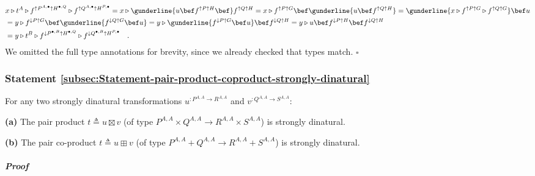\begin{align*}
 & x\triangleright t^{A}\triangleright f^{\uparrow P^{A,\bullet}\uparrow H^{\bullet,Q}}\triangleright f^{\uparrow Q^{A,\bullet}\uparrow H^{P,\bullet}}=x\triangleright\gunderline{u\bef f^{\uparrow P\uparrow H}\bef}f^{\uparrow Q\uparrow H}=x\triangleright f^{\uparrow P\uparrow G}\bef\gunderline{u\bef f^{\uparrow Q\uparrow H}}=\gunderline{x\triangleright f^{\uparrow P\uparrow G}\triangleright f^{\uparrow Q\uparrow G}}\bef u\\
 & =y\triangleright f^{\downarrow P\uparrow G}\bef\gunderline{f^{\downarrow Q\uparrow G}\bef u}=y\triangleright\gunderline{f^{\downarrow P\uparrow G}\bef u}\bef f^{\downarrow Q\uparrow H}=y\triangleright u\bef f^{\downarrow P\uparrow H}\bef f^{\downarrow Q\uparrow H}\\
 & =y\triangleright t^{B}\triangleright f^{\downarrow P^{\bullet,B}\uparrow H^{\bullet,Q}}\triangleright f^{\downarrow Q^{\bullet,B}\uparrow H^{P,\bullet}}\quad.
\end{align*}
We omitted the full type annotations for brevity, since we already
checked that types match. $\square$

\subsubsection{Statement \label{subsec:Statement-pair-product-coproduct-strongly-dinatural}\ref{subsec:Statement-pair-product-coproduct-strongly-dinatural}}

For any two strongly dinatural transformations $u^{:P^{A,A}\rightarrow R^{A,A}}$
and $v^{:Q^{A,A}\rightarrow S^{A,A}}$:

\textbf{(a)} The pair product $t\triangleq u\boxtimes v$ (of type
$P^{A,A}\times Q^{A,A}\rightarrow R^{A,A}\times S^{A,A}$) is strongly
dinatural.

\textbf{(b)} The pair co-product
$t\triangleq u\boxplus v$ (of type $P^{A,A}+Q^{A,A}\rightarrow R^{A,A}+S^{A,A}$)
is strongly dinatural.

\subparagraph{Proof}

